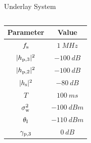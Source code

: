 \documentclass[16pt]{beamer}
\begin{document}
\begin{frame}[t]{Underlay System}
\begin{columns}
\begin{column}{0.45\columnwidth}
{			}
			\vspace{3mm}
			\onslide<2->
			{
				\centering
		                \renewcommand{\arraystretch}{1.6}
       		                \begin{tabular}{c||c}
                		\rowcolor{kit-green30}
                		Parameter & Value \\
                		\hline\hline
                		$f_{\text{s}}$ & $\SI{1}{MHz}$ \\ %
                		$|h_{\text{p,3}}|^2$ & $\SI{-100}{dB}$ \\ %
                		$|h_{\text{p,2}}|^2$ & $\SI{-100}{dB}$ \\ %
                		$|h_{\text{s}}|^2$ & $\SI{-80}{dB}$ \\ %
                		$T$ & $\SI{100}{ms}$ \\ %
				$\sigma^2_{\text{w}}$ & $\SI{-100}{dBm}$ \\ %
                		$\theta_{\text{I}}$ & $\SI{-110}{dBm}$ \\
				${\gamma}_{\text{p,3}}$ & $\SI{0}{dB}$ \\ 	
                		\hline
        			\end{tabular}
	
}
\end{column}
\end{columns}
\end{frame}
\end{document}
